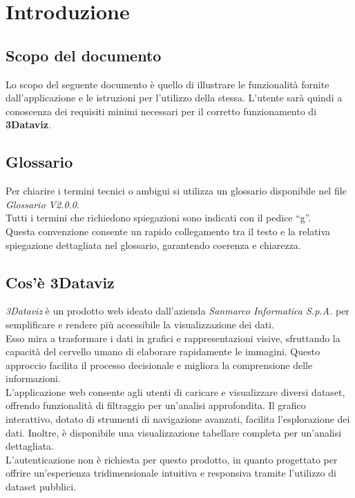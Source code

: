 \section{Introduzione}
\subsection{Scopo del documento}
Lo scopo del seguente documento è quello di illustrare le funzionalità fornite dall’applicazione e le istruzioni
per l’utilizzo della stessa. L’utente sarà quindi a conoscenza dei requisiti minimi necessari per il
corretto funzionamento di \textbf{3Dataviz}.

\subsection{Glossario}
Per chiarire i termini tecnici o ambigui si utilizza un glossario disponibile nel file \textit{Glossario V2.0.0}.\\
Tutti i termini che richiedono spiegazioni sono indicati con il pedice “g”. \\
Questa convenzione consente un rapido collegamento tra il testo e la relativa spiegazione dettagliata nel glossario, garantendo coerenza e chiarezza.

\subsection{Cos'è 3Dataviz}
\textit{3Dataviz} è un prodotto web ideato dall'azienda \textit{Sanmarco Informatica S.p.A.} per semplificare e rendere più accessibile la visualizzazione dei dati.\\
Esso mira a trasformare i dati in grafici e rappresentazioni visive, sfruttando la capacità del cervello umano di elaborare rapidamente le immagini. 
Questo approccio facilita il processo decisionale e migliora la comprensione delle informazioni.\\

L'applicazione web consente agli utenti di caricare e visualizzare diversi dataset, offrendo funzionalità di filtraggio per un'analisi approfondita.
Il grafico interattivo, dotato di strumenti di navigazione avanzati, facilita l'esplorazione dei dati. 
Inoltre, è disponibile una visualizzazione tabellare completa per un'analisi dettagliata.\\

L'autenticazione non è richiesta per questo prodotto, in quanto progettato per offrire un'esperienza tridimensionale
intuitiva e responsiva tramite l'utilizzo di dataset pubblici.

